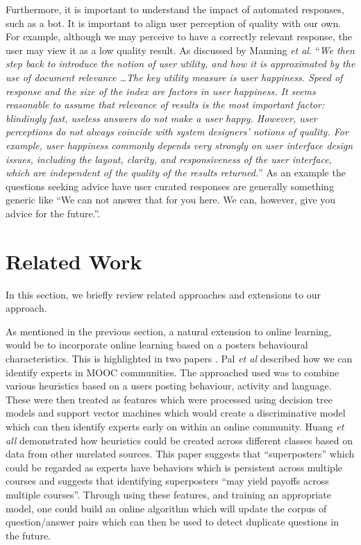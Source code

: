 \documentclass[journal]{IEEEtran}
\begin{document}
Furthermore, it is important to understand the impact of automated responses, such as a bot. It is important to align user perception of quality with our own. For example, although we may perceive to have a correctly relevant response, the user may view it as a low quality result. As discussed by Manning \emph{et al.}\cite{introIR}  ``\emph{We then step back to introduce the notion of user utility, and how it is approximated by the use of document relevance \dots The key utility measure is user happiness. Speed of response and the size of the index are factors in user happiness. It seems reasonable to assume that relevance of results is the most important factor: blindingly fast, useless answers do not make a user happy. However, user perceptions do not always coincide with system designers' notions of quality. For example, user happiness commonly depends very strongly on user interface design issues, including the layout, clarity, and responsiveness of the user interface, which are independent of the quality of the results returned.}'' As an example the questions seeking advice have user curated responses are generally something generic like ``We can not answer that for you here. We can, however, give you advice for the future.''\cite{redditfaq}. 



\section{Related Work}

In this section, we briefly review related approaches and extensions to our approach. 

As mentioned in the previous section, a natural extension to online learning, would be to incorporate online learning based on a posters behavioural characteristics. This is highlighted in two papers \cite{pal}\cite{supermooc}. Pal \emph{et al}\cite{pal} described how we can identify experts in MOOC communities. The approached used was to combine various heuristics based on a users posting behaviour, activity and language. These were then treated as features which were processed using decision tree models and support vector machines which would create a discriminative model which can then identify experts early on within an online community. Huang \emph{et all}\cite{supermooc} demonstrated how heuristics could be created across different classes based on data from other unrelated sources. This paper suggests that ``superposters'' which could be regarded as experts have behaviors which is persistent across multiple courses and suggests that identifying superposters ``may yield payoffs across multiple courses''. Through using these features, and training an appropriate model, one could build an online algorithm which will update the corpus of question/answer pairs which can then be used to detect duplicate questions in the future. 
\end{document}

